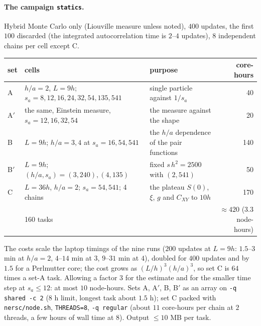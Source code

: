\documentclass[11pt,aps,preprint,nofootinbib,superscriptaddress,tightenlines]{revtex4-2}
\let\oldparagraph\paragraph
\renewcommand{\paragraph}{\par\bigskip\oldparagraph}
\begin{document}
\paragraph{The campaign \texttt{statics}.}  Hybrid Monte Carlo only (Liouville measure unless noted), $400$ updates, the first $100$ discarded (the integrated
autocorrelation time is $2$--$4$ updates), $8$ independent chains per cell except C.
\begin{center}\small
\begin{tabular}{lp{}p{}r}
\toprule
set & cells & purpose & core-hours \\
\midrule
A & $h/a=2$, $L=9h$; $s_a=8,12,16,24,32,54,135,541$ & single particle against $1/s_a$ & 40 \\
A$'$ & the same, Einstein measure, $s_a=12,16,32,54$ & the measure against the shape & 20 \\
B & $L=9h$; $h/a=3,4$ at $s_a=16,54,541$ & the $h/a$ dependence of the pair functions & 140 \\
B$'$ & $L=9h$; $(h/a,s_a)=(3,240),(4,135)$ & fixed $s\,h^2=2500$ with $(2,541)$ & 50 \\
C & $L=36h$, $h/a=2$; $s_a=54,541$; 4 chains & the plateau $S(0)$, $\xi$, $g$ and $C_{XY}$ to $10h$ & 170 \\
\midrule
 & 160 tasks & & $\approx420$ ($3.3$ node-hours) \\
\bottomrule
\end{tabular}
\end{center}
The costs scale the laptop timings of the nine runs ($200$ updates at $L=9h$: $1.5$--$3$ min at $h/a=2$, $4$--$14$ min at $3$, $9$--$31$ min at $4$),
doubled for $400$ updates and by $1.5$ for a Perlmutter core; the cost grows as $(L/h)^3(h/a)^3$, so set C is $64$ times a set-A task.  Allowing a
factor $3$ for the estimate and for the smaller time step at $s_a\le12$: at most $10$ node-hours.  Sets A, A$'$, B, B$'$ as an array on \texttt{-q shared -c 2}
($8$ h limit, longest task about $1.5$ h); set C packed with \texttt{nersc/node.sh}, \texttt{THREADS=8}, \texttt{-q regular} (about $11$ core-hours per chain at $2$ threads,
a few hours of wall time at $8$).  Output $\le10$ MB per task.
\end{document}
